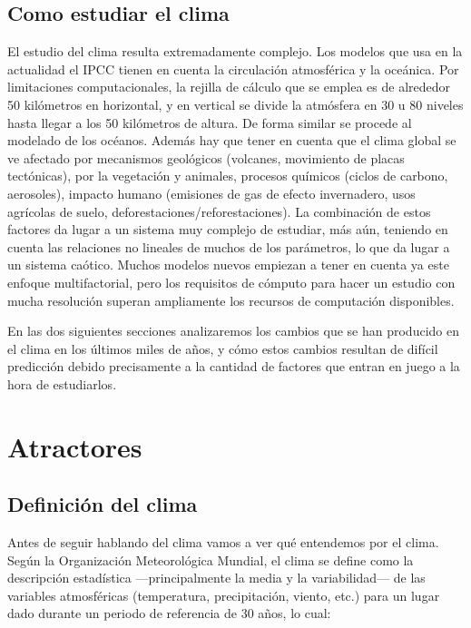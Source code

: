 \documentclass[
  10pt,
  a4paper,
  DIV=11,
  numbers=noendperiod,
  open=any]{scrreprt}
\numberwithin{equation}{chapter}
\numberwithin{equation}{section}
\renewcommand{\[}{\begin{equation}}
\renewcommand{\]}{\end{equation}}
\begin{document}
\section{Como estudiar el clima}\label{como-estudiar-el-clima}

El estudio del clima resulta extremadamente complejo. Los modelos que
usa en la actualidad el IPCC tienen en cuenta la circulación atmosférica
y la oceánica. Por limitaciones computacionales, la rejilla de cálculo
que se emplea es de alrededor 50 kilómetros en horizontal, y en vertical
se divide la atmósfera en 30 u 80 niveles hasta llegar a los 50
kilómetros de altura. De forma similar se procede al modelado de los
océanos. Además hay que tener en cuenta que el clima global se ve
afectado por mecanismos geológicos (volcanes, movimiento de placas
tectónicas), por la vegetación y animales, procesos químicos (ciclos de
carbono, aerosoles), impacto humano (emisiones de gas de efecto
invernadero, usos agrícolas de suelo, deforestaciones/reforestaciones).
La combinación de estos factores da lugar a un sistema muy complejo de
estudiar, más aún, teniendo en cuenta las relaciones no lineales de
muchos de los parámetros, lo que da lugar a un sistema caótico. Muchos
modelos nuevos empiezan a tener en cuenta ya este enfoque
multifactorial, pero los requisitos de cómputo para hacer un estudio con
mucha resolución superan ampliamente los recursos de computación
disponibles.

En las dos siguientes secciones analizaremos los cambios que se han
producido en el clima en los últimos miles de años, y cómo estos cambios
resultan de difícil predicción debido precisamente a la cantidad de
factores que entran en juego a la hora de estudiarlos.

\chapter{Atractores}\label{atractores}

\section{Definición del clima}\label{definiciuxf3n-del-clima}

Antes de seguir hablando del clima vamos a ver qué entendemos por el
clima. Según la Organización Meteorológica Mundial, el clima se define
como la descripción estadística ---principalmente la media y la
variabilidad--- de las variables atmosféricas (temperatura,
precipitación, viento, etc.) para un lugar dado durante un periodo de
referencia de 30 años, lo cual:
\end{document}
